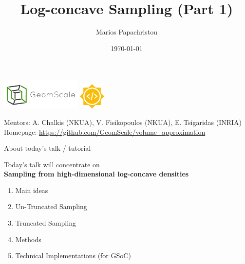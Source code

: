 \documentclass{beamer}
\title{Log-concave Sampling (Part 1)}
\author{Marios Papachristou}
\institute{GeomScale, NTUA}
\date{\today}
\begin{document}
\begin{frame}
    \titlepage
    \begin{center}
        \includegraphics[width=0.3\textwidth]{publications/presentations/log_concave_sampling/logo.png} \quad 
        \includegraphics[width=0.1\textwidth]{publications/presentations/log_concave_sampling/gsoc.png} 
    \end{center}
    
    \small {
    Mentors: A. Chalkis (NKUA), V. Fisikopoulos (NKUA), E. Tsigaridas (INRIA) \\
    Homepage: \url{https://github.com/GeomScale/volume_approximation}
    }
\end{frame}


\begin{frame}{About today's talk / tutorial}

Today's talk will concentrate on 
\\
\textbf{Sampling from high-dimensional log-concave densities}

\begin{enumerate}
    \item Main ideas 
    \item Un-Truncated Sampling
    \item Truncated Sampling
    \item Methods 
    \item Technical Implementations (for GSoC)
\end{enumerate}
    
\end{frame}
\end{document}
